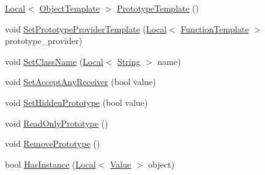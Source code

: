 \begin{DoxyCompactItemize}
\item 
\mbox{\hyperlink{classv8_1_1Local}{Local}}$<$ \mbox{\hyperlink{classv8_1_1ObjectTemplate}{Object\+Template}} $>$ \mbox{\hyperlink{classv8_1_1FunctionTemplate_aa2bcc2652b5f0fdbc666d943ccf72021}{Prototype\+Template}} ()
\item 
void \mbox{\hyperlink{classv8_1_1FunctionTemplate_abbe5fd8e3688db6dfb3793f9a48aa372}{Set\+Prototype\+Provider\+Template}} (\mbox{\hyperlink{classv8_1_1Local}{Local}}$<$ \mbox{\hyperlink{classv8_1_1FunctionTemplate}{Function\+Template}} $>$ prototype\+\_\+provider)
\item 
void \mbox{\hyperlink{classv8_1_1FunctionTemplate_a491e77dc7ceb5b0fe75880d11f2dbe9e}{Set\+Class\+Name}} (\mbox{\hyperlink{classv8_1_1Local}{Local}}$<$ \mbox{\hyperlink{classv8_1_1String}{String}} $>$ name)
\item 
void \mbox{\hyperlink{classv8_1_1FunctionTemplate_a5ffdc68d8035b02ed7583950b76ef91f}{Set\+Accept\+Any\+Receiver}} (bool value)
\item 
void \mbox{\hyperlink{classv8_1_1FunctionTemplate_ade426e8a21d777ae6100e6c1aa7bfaee}{Set\+Hidden\+Prototype}} (bool value)
\item 
void \mbox{\hyperlink{classv8_1_1FunctionTemplate_a91d2e0643e8c5a53ab1d75f7766c2422}{Read\+Only\+Prototype}} ()
\item 
void \mbox{\hyperlink{classv8_1_1FunctionTemplate_a4a184aca244174c7fe52d58871d3129e}{Remove\+Prototype}} ()
\item 
bool \mbox{\hyperlink{classv8_1_1FunctionTemplate_a90d838f3456d300bd19d2a2cb98645bd}{Has\+Instance}} (\mbox{\hyperlink{classv8_1_1Local}{Local}}$<$ \mbox{\hyperlink{classv8_1_1Value}{Value}} $>$ object)
\end{DoxyCompactItemize}
